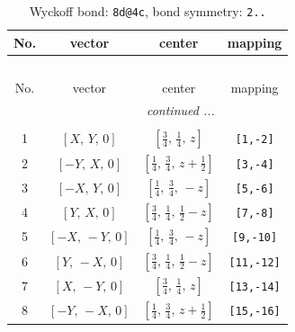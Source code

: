\documentclass[fleqn,8pt]{jsarticle}
\begin{document}
\begin{longtable}{cccc}
\caption{Wyckoff bond: {\tt 8d@4c}, bond symmetry: {\tt 2..}}
 \\
 \hline \hline
No. & vector & center & mapping \\ \hline \endfirsthead

\multicolumn{3}{l}{\tablename\ \thetable{}} \\
 \hline \hline
No. & vector & center & mapping \\ \hline \endhead

 \hline \hline
\multicolumn{3}{r}{\footnotesize\it continued ...} \\ \endfoot

 \hline \hline
\multicolumn{3}{r}{} \\ \endlastfoot

1 & $\left[ X,\, Y,\, 0 \right]$ & $\left[ \frac{3}{4},\, \frac{1}{4},\, z \right]$ & {\tt [1,-2]} \\ \hline
2 & $\left[ - Y,\, X,\, 0 \right]$ & $\left[ \frac{1}{4},\, \frac{3}{4},\, z + \frac{1}{2} \right]$ & {\tt [3,-4]} \\ \hline
3 & $\left[ - X,\, Y,\, 0 \right]$ & $\left[ \frac{1}{4},\, \frac{3}{4},\, - z \right]$ & {\tt [5,-6]} \\ \hline
4 & $\left[ Y,\, X,\, 0 \right]$ & $\left[ \frac{3}{4},\, \frac{1}{4},\, \frac{1}{2} - z \right]$ & {\tt [7,-8]} \\ \hline
5 & $\left[ - X,\, - Y,\, 0 \right]$ & $\left[ \frac{1}{4},\, \frac{3}{4},\, - z \right]$ & {\tt [9,-10]} \\ \hline
6 & $\left[ Y,\, - X,\, 0 \right]$ & $\left[ \frac{3}{4},\, \frac{1}{4},\, \frac{1}{2} - z \right]$ & {\tt [11,-12]} \\ \hline
7 & $\left[ X,\, - Y,\, 0 \right]$ & $\left[ \frac{3}{4},\, \frac{1}{4},\, z \right]$ & {\tt [13,-14]} \\ \hline
8 & $\left[ - Y,\, - X,\, 0 \right]$ & $\left[ \frac{1}{4},\, \frac{3}{4},\, z + \frac{1}{2} \right]$ & {\tt [15,-16]} \\
\end{longtable}
\renewcommand{\arraystretch}{1.2}
\end{document}
